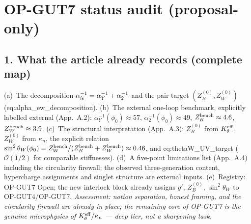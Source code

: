 \section*{OP-GUT7 status audit (proposal-only)}

\subsection*{1. What the article already records (complete map)}
(a)~The decomposition
$\alpha_{\rm fs}^{-1}=\alpha_Y^{-1}+\alpha_2^{-1}$ and the pair
target $(Z_B^{(0)},Z_W^{(0)})$ (eq:alpha\_ew\_decomposition).
(b)~The external one-loop benchmark, explicitly labelled external
(App.~A.2): $\alpha_Y^{-1}(\phi_0)\approx57$,
$\alpha_2^{-1}(\phi_0)\approx49$, $Z_B^{\rm bench}\approx4.6$,
$Z_W^{\rm bench}\approx3.9$.
(c)~The structural interpretation (App.~A.3): $Z_B^{(0)}$ from
$K_\theta^{\rm eff}$, $Z_W^{(0)}$ from $\kappa_n$, the explicit
relation
$\sin^2\theta_W(\phi_0)
=Z_W^{\rm bench}/(Z_B^{\rm bench}+Z_W^{\rm bench})\approx0.46$,
and eq:thetaW\_UV\_target ($\mathcal O(1/2)$ for comparable
stiffnesses).
(d)~A five-point limitations list (App.~A.4) including the
circularity firewall: the observed three-generation content,
hypercharge assignments and singlet structure are external inputs.
(e)~Registry: OP-GUT7 Open; the new interlock block already
assigns $g'$, $Z_B^{(0)}$, $\sin^2\theta_W$ to OP-GUT4/OP-GUT7.
\emph{Assessment: notion separation, honest framing, and the
circularity firewall are already in place; the remaining core of
OP-GUT7 is the genuine microphysics of
$K_\theta^{\rm eff}/\kappa_n$ --- deep tier, not a sharpening
task.}

